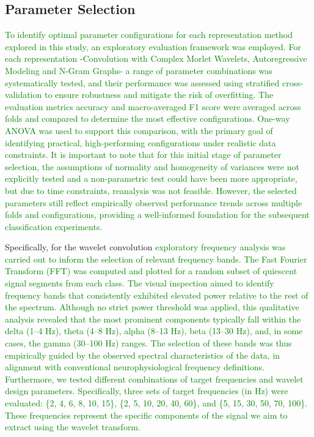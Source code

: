 \documentclass{article}
\begin{document}
\subsection{Parameter Selection}

\textcolor{green}{To identify optimal parameter configurations for each representation method explored in this study, an exploratory evaluation framework was employed. For each representation -Convolution with Complex Morlet Wavelets, Autoregressive Modeling and N-Gram Graphs- a range of parameter combinations was systematically tested, and their performance was assessed using stratified cross-validation to ensure robustness and mitigate the risk of overfitting. The evaluation metrics accuracy and macro-averaged F1 score were averaged across folds and compared to determine the most effective configurations. One-way ANOVA was used to support this comparison, with the primary goal of identifying practical, high-performing configurations under realistic data constraints. It is important to note that for this initial stage of parameter selection, the assumptions of normality and homogeneity of variances were not explicitly tested and a non-parametric test could have been more appropriate, but due to time constraints, reanalysis was not feasible. However, the selected parameters still reflect empirically observed performance trends across multiple folds and configurations, providing a well-informed foundation for the subsequent classification experiments.}
	
Specifically, for the wavelet convolution \textcolor{green}{exploratory frequency analysis was carried out to inform the selection of relevant frequency bands. The Fast Fourier Transform (FFT) was computed and plotted for a random subset of quiescent signal segments from each class. The visual inspection aimed to identify frequency bands that consistently exhibited elevated power relative to the rest of the spectrum. Although no strict power threshold was applied, this qualitative analysis revealed that the most prominent components typically fall within the delta (1–4 Hz), theta (4–8 Hz), alpha (8–13 Hz), beta (13–30 Hz), and, in some cases, the gamma (30–100 Hz) ranges. The selection of these bands was thus empirically guided by the observed spectral characteristics of the data, in alignment with conventional neurophysiological frequency definitions. Furthermore, we tested different combinations of target frequencies and wavelet design parameters. Specifically, three sets of target frequencies (in Hz) were evaluated: \{2, 4, 6, 8, 10, 15\}, \{2, 5, 10, 20, 40, 60\}, and \{5, 15, 30, 50, 70, 100\}. These frequencies represent the specific components of the signal we aim to extract using the wavelet transform.}
\end{document}
